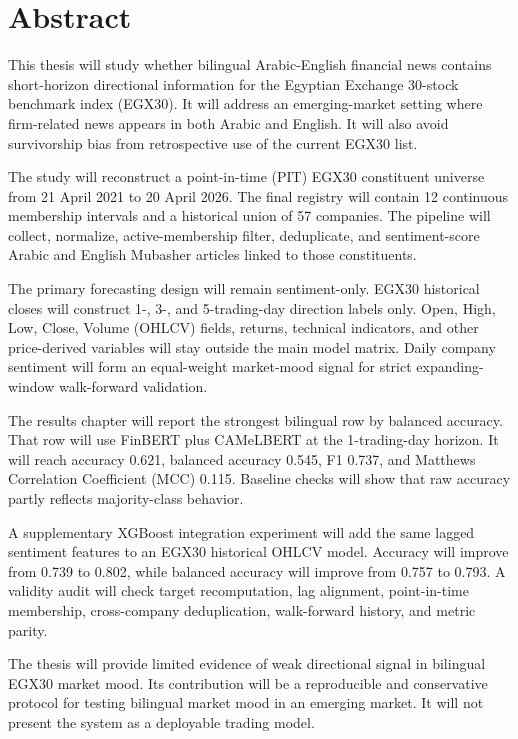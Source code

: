\chapter*{Abstract}
\label{chap:abstract}

This thesis will study whether bilingual Arabic-English financial news contains short-horizon directional information for the Egyptian Exchange 30-stock benchmark index (EGX30). It will address an emerging-market setting where firm-related news appears in both Arabic and English. It will also avoid survivorship bias from retrospective use of the current EGX30 list.

The study will reconstruct a point-in-time (PIT) EGX30 constituent universe from 21 April 2021 to 20 April 2026. The final registry will contain 12 continuous membership intervals and a historical union of 57 companies. The pipeline will collect, normalize, active-membership filter, deduplicate, and sentiment-score Arabic and English Mubasher articles linked to those constituents.

The primary forecasting design will remain sentiment-only. EGX30 historical closes will construct 1-, 3-, and 5-trading-day direction labels only. Open, High, Low, Close, Volume (OHLCV) fields, returns, technical indicators, and other price-derived variables will stay outside the main model matrix. Daily company sentiment will form an equal-weight market-mood signal for strict expanding-window walk-forward validation.

The results chapter will report the strongest bilingual row by balanced accuracy. That row will use FinBERT plus CAMeLBERT at the 1-trading-day horizon. It will reach accuracy 0.621, balanced accuracy 0.545, F1 0.737, and Matthews Correlation Coefficient (MCC) 0.115. Baseline checks will show that raw accuracy partly reflects majority-class behavior.

A supplementary XGBoost integration experiment will add the same lagged sentiment features to an EGX30 historical OHLCV model. Accuracy will improve from 0.739 to 0.802, while balanced accuracy will improve from 0.757 to 0.793. A validity audit will check target recomputation, lag alignment, point-in-time membership, cross-company deduplication, walk-forward history, and metric parity.

The thesis will provide limited evidence of weak directional signal in bilingual EGX30 market mood. Its contribution will be a reproducible and conservative protocol for testing bilingual market mood in an emerging market. It will not present the system as a deployable trading model.
